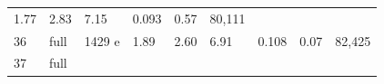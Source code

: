 \documentclass[
  10pt, ]{article}
\begin{document}
\begin{longtable}[]{@{}lllllllll@{}}
\begin{minipage}[t]{0.08\columnwidth}
1.77\strut
\end{minipage} & \begin{minipage}[t]{0.08\columnwidth}\raggedright
2.83\strut
\end{minipage} & \begin{minipage}[t]{0.08\columnwidth}\raggedright
7.15\strut
\end{minipage} & \begin{minipage}[t]{0.08\columnwidth}\raggedright
0.093\strut
\end{minipage} & \begin{minipage}[t]{0.08\columnwidth}\raggedright
0.57\strut
\end{minipage} & \begin{minipage}[t]{0.08\columnwidth}\raggedright
80,111\strut
\end{minipage}\tabularnewline
\begin{minipage}[t]{0.08\columnwidth}\raggedright
36\strut
\end{minipage} & \begin{minipage}[t]{0.08\columnwidth}\raggedright
full\strut
\end{minipage} & \begin{minipage}[t]{0.08\columnwidth}\raggedright
1429 e\strut
\end{minipage} & \begin{minipage}[t]{0.08\columnwidth}\raggedright
1.89\strut
\end{minipage} & \begin{minipage}[t]{0.08\columnwidth}\raggedright
2.60\strut
\end{minipage} & \begin{minipage}[t]{0.08\columnwidth}\raggedright
6.91\strut
\end{minipage} & \begin{minipage}[t]{0.08\columnwidth}\raggedright
0.108\strut
\end{minipage} & \begin{minipage}[t]{0.08\columnwidth}\raggedright
0.07\strut
\end{minipage} & \begin{minipage}[t]{0.08\columnwidth}\raggedright
82,425\strut
\end{minipage}\tabularnewline
\begin{minipage}[t]{0.08\columnwidth}\raggedright
37\strut
\end{minipage} & \begin{minipage}[t]{0.08\columnwidth}\raggedright
full\strut
\end{minipage} & \begin{minipage}[t]{0.08\columnwidth}\raggedright

\end{minipage}
\end{longtable}
\end{document}
